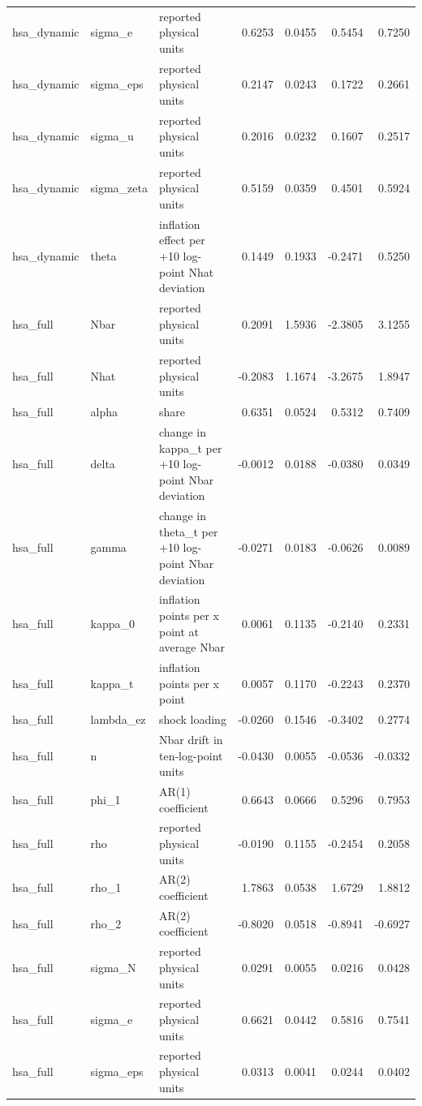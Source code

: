 \begin{tabular}{lllrrrr}
hsa\_dynamic & sigma\_e & reported physical units & 0.6253 & 0.0455 & 0.5454 & 0.7250 \\
hsa\_dynamic & sigma\_eps & reported physical units & 0.2147 & 0.0243 & 0.1722 & 0.2661 \\
hsa\_dynamic & sigma\_u & reported physical units & 0.2016 & 0.0232 & 0.1607 & 0.2517 \\
hsa\_dynamic & sigma\_zeta & reported physical units & 0.5159 & 0.0359 & 0.4501 & 0.5924 \\
hsa\_dynamic & theta & inflation effect per +10 log-point Nhat deviation & 0.1449 & 0.1933 & -0.2471 & 0.5250 \\
hsa\_full & Nbar & reported physical units & 0.2091 & 1.5936 & -2.3805 & 3.1255 \\
hsa\_full & Nhat & reported physical units & -0.2083 & 1.1674 & -3.2675 & 1.8947 \\
hsa\_full & alpha & share & 0.6351 & 0.0524 & 0.5312 & 0.7409 \\
hsa\_full & delta & change in kappa\_t per +10 log-point Nbar deviation & -0.0012 & 0.0188 & -0.0380 & 0.0349 \\
hsa\_full & gamma & change in theta\_t per +10 log-point Nbar deviation & -0.0271 & 0.0183 & -0.0626 & 0.0089 \\
hsa\_full & kappa\_0 & inflation points per x point at average Nbar & 0.0061 & 0.1135 & -0.2140 & 0.2331 \\
hsa\_full & kappa\_t & inflation points per x point & 0.0057 & 0.1170 & -0.2243 & 0.2370 \\
hsa\_full & lambda\_ez & shock loading & -0.0260 & 0.1546 & -0.3402 & 0.2774 \\
hsa\_full & n & Nbar drift in ten-log-point units & -0.0430 & 0.0055 & -0.0536 & -0.0332 \\
hsa\_full & phi\_1 & AR(1) coefficient & 0.6643 & 0.0666 & 0.5296 & 0.7953 \\
hsa\_full & rho & reported physical units & -0.0190 & 0.1155 & -0.2454 & 0.2058 \\
hsa\_full & rho\_1 & AR(2) coefficient & 1.7863 & 0.0538 & 1.6729 & 1.8812 \\
hsa\_full & rho\_2 & AR(2) coefficient & -0.8020 & 0.0518 & -0.8941 & -0.6927 \\
hsa\_full & sigma\_N & reported physical units & 0.0291 & 0.0055 & 0.0216 & 0.0428 \\
hsa\_full & sigma\_e & reported physical units & 0.6621 & 0.0442 & 0.5816 & 0.7541 \\
hsa\_full & sigma\_eps & reported physical units & 0.0313 & 0.0041 & 0.0244 & 0.0402 \\

\end{tabular}
